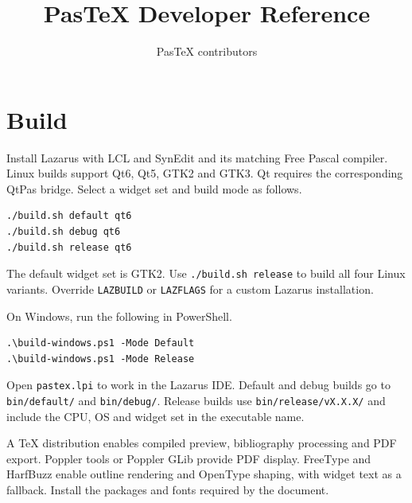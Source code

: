 \documentclass[11pt]{article}
\title{PasTeX Developer Reference}
\author{PasTeX contributors}
\date{}
\begin{document}
\maketitle

\section{Build}
Install Lazarus with LCL and SynEdit and its matching Free Pascal compiler.
Linux builds support Qt6, Qt5, GTK2 and GTK3. Qt requires the corresponding
QtPas bridge. Select a widget set and build mode as follows.
\begin{verbatim}
./build.sh default qt6
./build.sh debug qt6
./build.sh release qt6
\end{verbatim}
The default widget set is GTK2. Use \texttt{./build.sh release} to build all
four Linux variants. Override \texttt{LAZBUILD} or \texttt{LAZFLAGS} for a
custom Lazarus installation.

On Windows, run the following in PowerShell.
\begin{verbatim}
.\build-windows.ps1 -Mode Default
.\build-windows.ps1 -Mode Release
\end{verbatim}
Open \texttt{pastex.lpi} to work in the Lazarus IDE. Default and debug builds
go to \texttt{bin/default/} and \texttt{bin/debug/}. Release builds use
\texttt{bin/release/vX.X.X/} and include the CPU, OS and widget set in the
executable name.

A \TeX{} distribution enables compiled preview, bibliography processing and
PDF export. Poppler tools or Poppler GLib provide PDF display. FreeType and
HarfBuzz enable outline rendering and OpenType shaping, with widget text as
a fallback. Install the packages and fonts required by the document.
\end{document}
